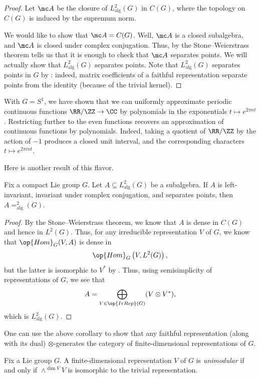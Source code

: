\documentclass[../notes.tex]{subfiles}
\begin{document}
\begin{proof}
	Let $\mc A$ be the closure of $L^2_{\mathrm{alg}}(G)$ in $C(G)$, where the topology on $C(G)$ is induced by the supremum norm.
	
	We would like to show that $\mc A=C(G)$. Well, $\mc A$ is a closed subalgebra, and $\mc A$ is closed under complex conjugation. Thus, by the Stone--Weierstrass theorem tells us that it is enough to check that $\mc A$ separates points. We will actually show that $L^2_{\mathrm{alg}}(G)$ separates points. Note that $L^2_{\mathrm{alg}}(G)$ separates points in $G$ by : indeed, matrix coefficients of a faithful representation separate points from the identity (because of the trivial kernel).
\end{proof}
\begin{example}
	With $G=S^1$, we have shown that we can uniformly approximate periodic continuous functions $\RR/\ZZ\to\CC$ by polynomials in the exponentials $t\mapsto e^{2\pi nt}$. Restricting further to the even functions recovers an approximation of continuous functions by polynomials. Indeed, taking a quotient of $\RR/\ZZ$ by the action of $-1$ produces a closed unit interval, and the corresponding characters $t\mapsto e^{2\pi int}$.
\end{example}
Here is another result of this flavor.
\begin{corollary} \label{cor:algebra-to-all-l2}
	Fix a compact Lie group $G$. Let $A\subseteq L^2_{\mathrm{alg}}(G)$ be a subalgebra. If $A$ is left-invariant, invariant under complex conjugation, and separates points, then $A=^2_{\mathrm{alg}}(G)$.
\end{corollary}
\begin{proof}
	By the Stone--Weierstrass theorem, we know that $A$ is dense in $C(G)$ and hence in $L^2(G)$. Thus, for any irreducible representation $V$ of $G$, we know that $\op{Hom}_G(V,A)$ is dense in
	\[\op{Hom}_G\left(V,L^2(G)\right),\]
	but the latter is isomorphic to $V^*$ by . Thus, using semisimplicity of representations of $G$, we see that
	\[A=\bigoplus_{V\in\op{IrRep}(G)}(V\otimes V^*),\]
	which is $L^2_{\mathrm{alg}}(G)$.
\end{proof}
One can use the above corollary to show that any faithful representation (along with its dual) $\otimes$-generates the category of finite-dimensional representations of $G$.
\begin{definition}[unimodular]
	Fix a Lie group $G$. A finite-dimensional representation $V$ of $G$ is \textit{unimodular} if and only if $\land^{\dim V}V$ is isomorphic to the trivial representation.
\end{definition}
\end{document}

